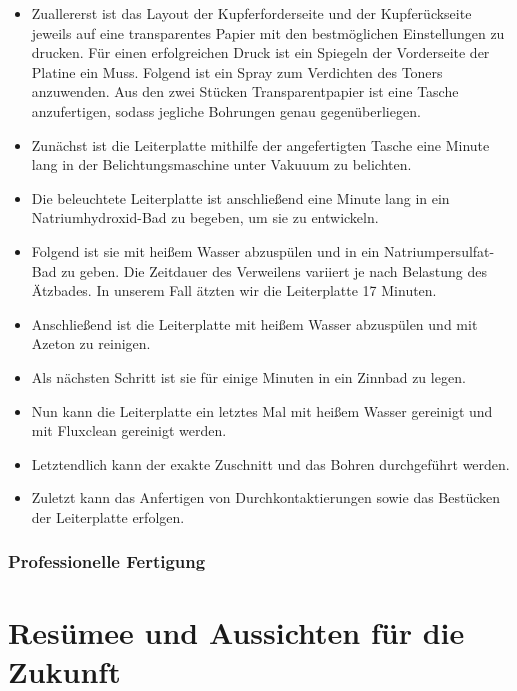 \begin{itemize}
    \item Zuallererst ist das Layout der Kupferforderseite und der Kupferückseite jeweils auf eine transparentes Papier mit den bestmöglichen Einstellungen zu drucken.
    Für einen erfolgreichen Druck ist ein Spiegeln der Vorderseite der Platine ein Muss.
    Folgend ist ein Spray zum Verdichten des Toners anzuwenden.
    Aus den zwei Stücken Transparentpapier ist eine Tasche anzufertigen, sodass jegliche Bohrungen genau gegenüberliegen. \\

    \item Zunächst ist die Leiterplatte mithilfe der angefertigten Tasche eine Minute lang in der Belichtungsmaschine unter Vakuuum zu belichten. \\

    \item Die beleuchtete Leiterplatte ist anschließend eine Minute lang in ein Natriumhydroxid-Bad zu begeben, um sie zu entwickeln. \\

    \item Folgend ist sie mit heißem Wasser abzuspülen und in ein Natriumpersulfat-Bad zu geben.
    Die Zeitdauer des Verweilens variiert je nach Belastung des Ätzbades.
    In unserem Fall ätzten wir die Leiterplatte 17 Minuten. \\

    \item Anschließend ist die Leiterplatte mit heißem Wasser abzuspülen und mit Azeton zu reinigen. \\

    \item Als nächsten Schritt ist sie für einige Minuten in ein Zinnbad zu legen. \\

    \item Nun kann die Leiterplatte ein letztes Mal mit heißem Wasser gereinigt und mit Fluxclean gereinigt werden.

    \item Letztendlich kann der exakte Zuschnitt und das Bohren durchgeführt werden. \\

    \item Zuletzt kann das Anfertigen von Durchkontaktierungen sowie das Bestücken der Leiterplatte erfolgen.
\end{itemize}

\subsubsection{Professionelle Fertigung}


\newpage
\section{Resümee und Aussichten für die Zukunft}
